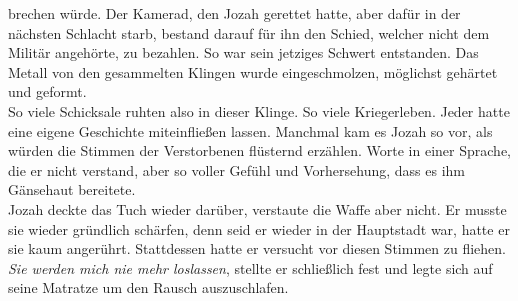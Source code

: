 brechen würde. Der Kamerad, den Jozah gerettet hatte, aber dafür in der nächsten Schlacht starb, 
bestand darauf für ihn den Schied, welcher nicht dem Militär angehörte, zu bezahlen. So war sein 
jetziges Schwert entstanden. Das Metall von den gesammelten Klingen wurde eingeschmolzen, möglichst 
gehärtet und geformt. \\
So viele Schicksale ruhten also in dieser Klinge. So viele Kriegerleben. Jeder hatte eine eigene 
Geschichte miteinfließen lassen. Manchmal kam es Jozah so vor, als würden die Stimmen der 
Verstorbenen flüsternd erzählen. Worte in einer Sprache, die er nicht verstand, aber so voller 
Gefühl und Vorhersehung, dass es ihm Gänsehaut bereitete.\\
Jozah deckte das Tuch wieder darüber, verstaute die Waffe aber nicht. Er musste sie wieder 
gründlich schärfen, denn seid er wieder in der Hauptstadt war, hatte er sie kaum angerührt. 
Stattdessen hatte er versucht vor diesen Stimmen zu fliehen. \textit{Sie werden mich nie mehr 
loslassen}, stellte er schließlich fest und legte sich auf seine Matratze um den Rausch 
auszuschlafen.\\

